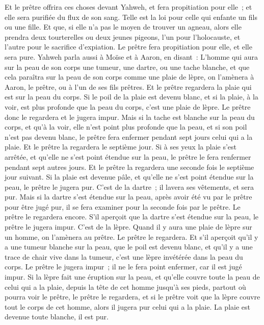 \begin{multicols}{2}
Et le prêtre offrira ces choses devant Yahweh, et fera propitiation pour elle~; et elle sera purifiée du flux de son sang. Telle est la loi pour celle qui enfante un fils ou une fille.
Et que, si elle n'a pas le moyen de trouver un agneau, alors elle prendra deux tourterelles ou deux jeunes pigeons, l'un pour l'holocauste, et l'autre pour le sacrifice d'expiation. Le prêtre fera propitiation pour elle, et elle sera pure.
\VerseOne{}Yahweh parla aussi à Moïse et à Aaron, en disant~:
L'homme qui aura sur la peau de son corps une tumeur, une dartre, ou une tache blanche, et que cela paraîtra sur la peau de son corps comme une plaie de lèpre, on l'amènera à Aaron, le prêtre, ou à l'un de ses fils prêtres.
Et le prêtre regardera la plaie qui est sur la peau du corps. Si le poil de la plaie est devenu blanc, et si la plaie, à la voir, est plus profonde que la peau du corps, c'est une plaie de lèpre. Le prêtre donc le regardera et le jugera impur.
Mais si la tache est blanche sur la peau du corps, et qu'à la voir, elle n'est point plus profonde que la peau, et si son poil n'est pas devenu blanc, le prêtre fera enfermer pendant sept jours celui qui a la plaie.
Et le prêtre la regardera le septième jour. Si à ses yeux la plaie s'est arrêtée, et qu'elle ne s'est point étendue sur la peau, le prêtre le fera renfermer pendant sept autres jours.
Et le prêtre la regardera une seconde fois le septième jour suivant. Si la plaie est devenue pâle, et qu'elle ne s'est point étendue sur la peau, le prêtre le jugera pur. C'est de la dartre~; il lavera ses vêtements, et sera pur.
Mais si la dartre s'est étendue sur la peau, après avoir été vu par le prêtre pour être jugé pur, il se fera examiner pour la seconde fois par le prêtre.
Le prêtre le regardera encore. S'il aperçoit que la dartre s'est étendue sur la peau, le prêtre le jugera impur. C'est de la lèpre.
Quand il y aura une plaie de lèpre sur un homme, on l'amènera au prêtre.
Le prêtre le regardera. Et s'il aperçoit qu'il y a une tumeur blanche sur la peau, que le poil est devenu blanc, et qu'il y a une trace de chair vive dans la tumeur,
c'est une lèpre invétérée dans la peau du corps. Le prêtre le jugera impur~; il ne le fera point enfermer, car il est jugé impur.
Si la lèpre fait une éruption sur la peau, et qu'elle couvre toute la peau de celui qui a la plaie, depuis la tête de cet homme jusqu'à ses pieds, partout où pourra voir le prêtre, le prêtre le regardera,
et si le prêtre voit que la lèpre couvre tout le corps de cet homme, alors il jugera pur celui qui a la plaie. La plaie est devenue toute blanche, il est pur.

\end{multicols}

